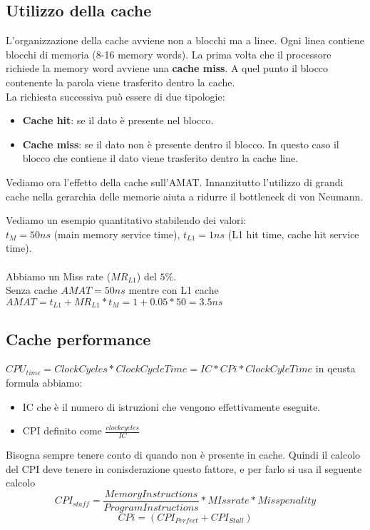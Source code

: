 \subsection{Utilizzo della cache}
L'organizzazione della cache avviene non a blocchi ma a linee. Ogni linea contiene blocchi di memoria (8-16 memory words). La prima volta che il processore richiede la memory word avviene una \textbf{cache miss}. A quel punto il blocco contenente la parola viene trasferito dentro la cache.\\
La richiesta successiva può essere di due tipologie:
\begin{itemize}
    \item \textbf{Cache hit}: se il dato è presente nel blocco.
    \item \textbf{Cache miss}: se il dato non è presente dentro il blocco. In questo caso il blocco che contiene il dato viene trasferito dentro la cache line.
\end{itemize}

Vediamo ora l'effetto della cache sull'AMAT. Innanzitutto l'utilizzo di grandi cache nella gerarchia delle memorie aiuta a ridurre il bottleneck di von Neumann. 
\begin{example}
Vediamo un esempio quantitativo stabilendo dei valori:\\
$t_M = 50ns$ (main memory service time), $t_{L1} = 1ns$ (L1 hit time, cache hit service time). \\\\
Abbiamo un Miss rate ($MR_{L1}$) del $5\%$.\\
Senza cache $AMAT = 50ns$ mentre con L1 cache $AMAT = t_{L1} + MR_{L1} * t_M = 1 + 0.05 * 50 = 3.5ns$
\end{example}

\subsection{Cache performance}
\(CPU_{time} = ClockCycles * ClockCycleTime = IC * CPi * ClockCyleTime\) in qeusta formula abbiamo:
\begin{itemize}
    \item IC che è il numero di istruzioni che vengono effettivamente eseguite.
    \item CPI definito come \(\frac{clockcycles}{IC}\)
\end{itemize}

Bisogna sempre tenere conto di quando non è presente in cache. Quindi il calcolo del CPI deve tenere in conisderazione questo fattore, e per farlo si usa il seguente calcolo
\[CPI_{staff} = \frac{Memory Instructions}{Program Instructions} * MIss rate * Miss penality\]
\[CPi = (CPI_{Perfect} + CPI_{Stall})\]

